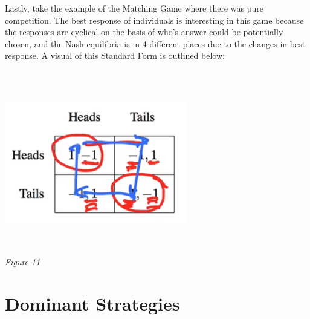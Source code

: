 \documentclass{article}
\begin{document}
\vskip 0.1in
Lastly, take the example of the Matching Game where there was pure competition. The best response of individuals is interesting in this game because the responses are cyclical on the basis of who's answer could be potentially chosen, and the Nash equilibria is in 4 different places due to the changes in best response. A visual of this Standard Form is outlined below:
\begin{center}
    \includegraphics[width = 8cm, height = 8cm]{IMG_011.png} \\
    \emph{Figure 11}
\end{center}

\section{Dominant Strategies}
\end{document}
